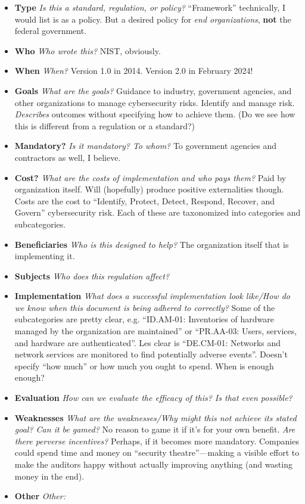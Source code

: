 \documentclass[11pt]{article}
\begin{document}
\begin{itemize}
    \item {\bf Type} {\it Is this a standard, regulation, or policy?} ``Framework'' technically, I would list is as a policy. But a desired policy for {\it end organizations}, {\bf not} the federal government.
    \item {\bf Who} {\it Who wrote this?} NIST, obviously.
    \item {\bf When} {\it When?} Version 1.0 in 2014. Version 2.0 in February 2024!
    \item {\bf Goals} {\it What are the goals?} Guidance to industry, government agencies, and other organizations to manage cybersecurity risks. Identify and manage risk. {\it Describes } outcomes without specifying how to achieve them. (Do we see how this is different from a regulation or a standard?)
    \item {\bf Mandatory?} {\it Is it mandatory? To whom?} To government agencies and contractors as well, I believe. 
    \item {\bf Cost?} {\it What are the costs of implementation and who pays them?} Paid by organization itself. Will (hopefully) produce positive externalities though. Costs are the cost to ``Identify, Protect, Detect, Respond, Recover, and Govern'' cybersecurity risk. Each of these are taxonomized into categories and subcategories. 
    \item {\bf Beneficiaries} {\it Who is this designed to help?} The organization itself that is implementing it.
    \item {\bf Subjects} {\it Who does this regulation affect?} 
    \item {\bf Implementation} {\it What does a successful implementation look like/How do we know when this document is being adhered to correctly?} Some of the subcategories are pretty clear, e.g. ``ID.AM-01: Inventories of hardware managed by the organization are maintained'' or ``PR.AA-03: Users, services, and hardware are authenticated''. Les clear is ``DE.CM-01: Networks and network services are monitored to find potentially adverse events''. Doesn't specify ``how much'' or how much you ought to spend. When is enough enough?
    \item {\bf Evaluation} {\it How can we evaluate the efficacy of this? Is that even possible?}
    \item {\bf Weaknesses} {\it What are the weaknesses/Why might this not achieve its stated goal? Can it be gamed?} No reason to game it if it's for your own benefit. {\it Are there perverse incentives?} Perhaps, if it becomes more mandatory. Companies could spend time and money on ``security theatre''---making a visible effort to make the auditors happy without actually improving anything (and wasting money in the end). 
    \item {\bf Other} {\it Other:}
\end{itemize}
\end{document}
